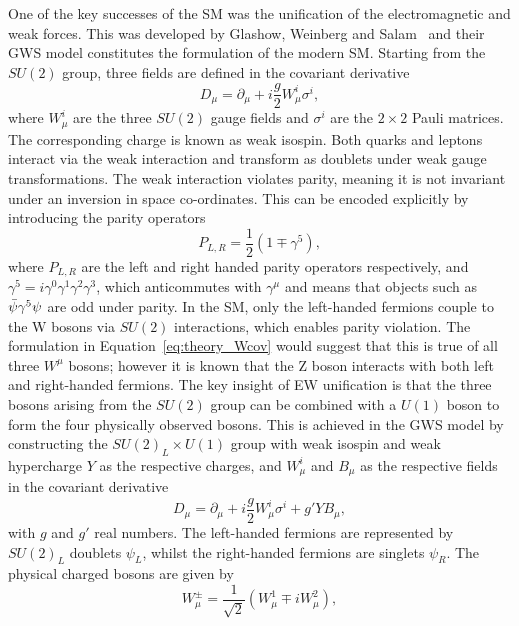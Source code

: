 One of the key successes of the SM was the unification of the electromagnetic and weak forces.
This was developed by Glashow, Weinberg and Salam~\cite{Glashow,Weinberg,Salam} 
and their GWS model constitutes the formulation of the modern SM.
Starting from the $SU(2)$ group, three fields are defined in the covariant derivative
\begin{equation}
\label{eq:theory_Wcov}
D_\mu = \partial_\mu + i \frac{g}{2} W_\mu^i \sigma^i ,
\end{equation}
where $W_\mu^i$ are the three $SU(2)$ gauge fields and $\sigma^i$ are the $2\times2$ Pauli matrices.
The corresponding charge is known as weak isospin. 
Both quarks and leptons interact via the weak interaction 
and transform as doublets under weak gauge transformations.
The weak interaction violates parity, 
meaning it is not invariant under an inversion in space co-ordinates.
This can be encoded explicitly by introducing the parity operators
\begin{equation}
P_{L,R} = \frac{1}{2} (1 \mp \gamma^5) ,
\end{equation}
where $P_{L,R}$ are the left and right handed parity operators respectively, 
and $\gamma^5 = i\gamma^0\gamma^1\gamma^2\gamma^3$, 
which anticommutes with $\gamma^\mu$ and means that objects such as $\bar{\psi} \gamma^5 \psi$
are odd under parity.
In the SM, only the left-handed fermions couple to the W bosons via $SU(2)$ interactions, 
which enables parity violation.
The formulation in Equation~\ref{eq:theory_Wcov} would suggest 
that this is true of all three $W^{\mu}$ bosons;
however it is known that the Z boson interacts with both left and right-handed fermions.
The key insight of EW unification is that the three bosons arising from the $SU(2)$ group 
can be combined with a $U(1)$ boson to form the four physically observed bosons.
This is achieved in the GWS model by constructing the $SU(2)_L \times U(1)$ group 
with weak isospin and weak hypercharge $Y$ as the respective charges, 
and $W^{i}_{\mu}$ and $B_{\mu}$ as the respective fields in the covariant derivative
\begin{equation}
\label{eq:theory_EWcov}
D_\mu = \partial_\mu + i \frac{g}{2} W_\mu^i \sigma^i + g' Y B_\mu ,
\end{equation}
with $g$ and $g'$ real numbers.
The left-handed fermions are represented by $SU(2)_L$ doublets $\psi_L$, 
whilst the right-handed fermions are singlets $\psi_R$.
The physical charged bosons are given by
\begin{equation}
W_\mu^\pm = \frac{1}{\sqrt{2}} (W_\mu^1 \mp iW_\mu^2) ,
\end{equation}
